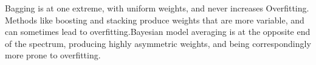 \documentclass{article}
\begin{document}
Bagging is at one extreme, with uniform weights, and never increases Overﬁtting. Methods like boosting and stacking produce weights that are more variable, and can sometimes lead to overﬁtting.Bayesian model averaging is at the opposite end of the spectrum, producing highly asymmetric weights, and being correspondingly more prone to overﬁtting.









\appendix
\end{document}
